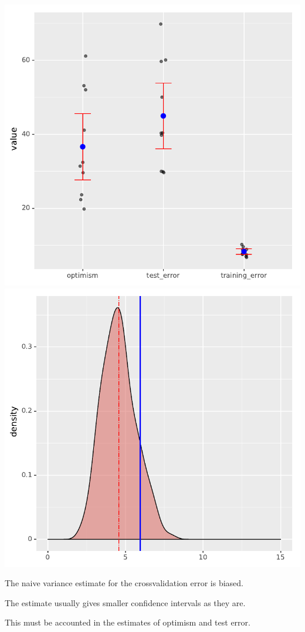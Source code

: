 \documentclass[landscape,footrule]{foils}
\begin{document}

\centerline{
\includegraphics[scale=0.8]{crossvalidation_moment_matching}\hspace*{0.5cm}
\includegraphics[scale=0.8]{crossvalidation_variance_estimate}}
\vspace*{-.5cm}
\begin{triangles}
\item The naive variance estimate for the crossvalidation error is biased.   
\item The estimate usually gives smaller confidence intervals as they are.  
\item This must be accounted in the estimates of optimism and test error. 
\end{triangles}
\end{document}
